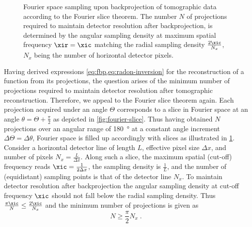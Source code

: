\documentclass[
twoside,
openright,
titlepage,
numbers=noenddot,
headinclude,
fleqn,
a4paper,
footinclude=true,
cleardoublepage=empty,
abstractoff,
BCOR=5mm,
paper=a4,
fontsize=11pt,
british,ngerman,american,
]{scrreprt}
\begin{document}
\begin{figure}
  \centering
  \small
  \caption[Fourier space sampling under tomographic
  backprojection.]{Fourier space sampling upon backprojection of
    tomographic data according to the Fourier slice theorem.  The
    number $N$ of projections required to maintain detector resolution
    after backprojection, is determined by the angular sampling
    density at maximum spatial frequency $\xir=\xic$ matching the
    radial sampling density $\frac{2\xic}{N_x}$, $N_x$ being the
    number of horizontal detector pixels.}
  \label{fig:fourier-space-sampling}
\end{figure}
Having derived expressions \cref{eq:fbp,eq:radon-inversion} for the
reconstruction of a function from its projections, the question arises
of the minimum number of projections required to maintain detector
resolution after tomographic reconstruction.  Therefore, we appeal to
the Fourier slice theorem again.  Each projection acquired under an
angle $\Theta$ corresponds to a slice in Fourier space at an angle
$\theta = \Theta+\frac{\pi}{2}$ as depicted in
\cref{fig:fourier-slice}.  Thus having obtained $N$ projections over
an angular range of \SI{180}{\degree} at a constant angle increment
$\Delta \Theta = \Delta \theta$, Fourier space is filled up
accordingly with slices as illustrated in
\cref{fig:fourier-space-sampling}.  Consider a horizontal detector
line of length $L$, effective pixel size $\Delta x$, and number of
pixels $N_x=\frac{L}{\Delta x}$.  Along such a slice, the maximum
spatial (cut-off) frequency reads $\xic=\frac{1}{2\Delta x}$, the
sampling density is $\frac{1}{L}$, and the number of (equidistant)
sampling points is that of the detector line $N_x$.  To maintain
detector resolution after backprojection the angular sampling density
at cut-off frequency $\xic$ should not fall below the radial
sampling density.  Thus $\frac{\pi \xic}{N}\le\frac{2\xic}{N_x}$ and
the minimum number of projections is given as
\begin{equation}
  \label{eq:num-proj}
  N \ge \frac{\pi}{2} N_x \;.
\end{equation}
\end{document}
